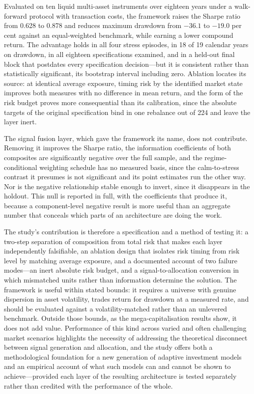 \documentclass{singlecol-new}
\theoremstyle{TH}{
\newtheorem{lemma}{Lemma}
\newtheorem{theorem}[lemma]{Theorem}
\newtheorem{corrolary}[lemma]{Corrolary}
\newtheorem{conjecture}[lemma]{Conjecture}
\newtheorem{proposition}[lemma]{Proposition}
\newtheorem{claim}[lemma]{Claim}
\newtheorem{stheorem}[lemma]{Wrong Theorem}
\newtheorem{algorithm}{Algorithm}
}
\theoremstyle{THrm}{
\newtheorem{definition}{Definition}[section]
\newtheorem{question}{Question}[section]
\newtheorem{remark}{Remark}
\newtheorem{scheme}{Scheme}
}
\theoremstyle{THhit}{
\newtheorem{case}{Case}[section]
}
\begin{document}
Evaluated on ten liquid multi-asset instruments over eighteen years under a walk-forward
protocol with transaction costs, the framework raises the Sharpe ratio from 0.628 to
0.878 and reduces maximum drawdown from $-36.1$ to $-19.0$ per cent against an
equal-weighted benchmark, while earning a lower compound return. The advantage holds in
all four stress episodes, in 18 of 19 calendar years on drawdown, in all eighteen
specifications examined, and in a held-out final block that postdates every specification
decision---but it is consistent rather than statistically significant, its bootstrap
interval including zero. Ablation locates its source: at identical average exposure,
timing risk by the identified market state improves both measures with no difference in
mean return, and the form of the risk budget proves more consequential than its
calibration, since the absolute targets of the original specification bind in one
rebalance out of 224 and leave the layer inert.

The signal fusion layer, which gave the framework its name, does not contribute. Removing
it improves the Sharpe ratio, the information coefficients of both composites are
significantly negative over the full sample, and the regime-conditional weighting schedule
has no measured basis, since the calm-to-stress contrast it presumes is not significant and
its point estimates run the other way. Nor is the negative relationship stable enough to
invert, since it disappears in the holdout. This null is reported in full, with the
coefficients that produce it, because a component-level negative result is more useful than
an aggregate number that conceals which parts of an architecture are doing the work.

The study's contribution is therefore a specification and a method of testing it: a
two-step separation of composition from total risk that makes each layer independently
falsifiable, an ablation design that isolates risk timing from risk level by matching
average exposure, and a documented account of two failure modes---an inert absolute risk
budget, and a signal-to-allocation conversion in which mismatched units rather than
information determine the solution. The framework is useful within stated bounds: it
requires a universe with genuine dispersion in asset volatility, trades return for
drawdown at a measured rate, and should be evaluated against a volatility-matched rather
than an unlevered benchmark. Outside those bounds, as the mega-capitalisation results
show, it does not add value. Performance of this kind across varied and often challenging
market scenarios highlights the necessity of addressing the theoretical disconnect between
signal generation and allocation, and the study offers both a methodological foundation
for a new generation of adaptive investment models and an empirical account of what such
models can and cannot be shown to achieve---provided each layer of the resulting
architecture is tested separately rather than credited with the performance of the whole.
\end{document}
